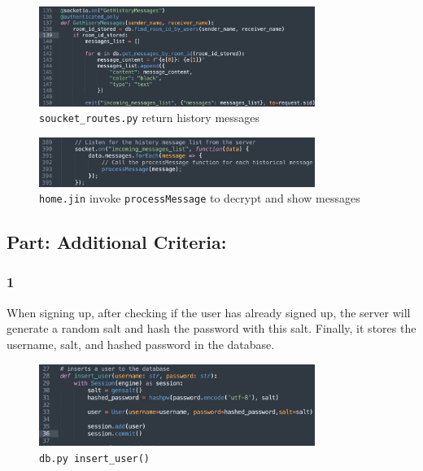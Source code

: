 \documentclass[12pt]{article}
\begin{document}
            \begin{figure}[H]
                \centering
                \includegraphics[width=0.8\textwidth]{graphs/return_history_message.jpg}
                \caption{\texttt{soucket\_routes.py} return history messages}
                \label{return history message}
            \end{figure}


            \begin{figure}[H]
                \centering
                \includegraphics[width=0.8\textwidth]{graphs/show_history_message.jpg}
                \caption{\texttt{home.jin} invoke \texttt{processMessage} to decrypt and show messages}
                \label{show history message}
            \end{figure}

    \subsection*{Part: Additional Criteria:}

        \subsubsection*{1} When signing up, after checking if the user has already signed up, the server will generate a random salt and hash the password with this salt. Finally, it stores the username, salt, and hashed password in the database.

        \begin{figure}[H]
            \centering
            \includegraphics[width=0.8\textwidth]{graphs/insert_user.jpg}
            \caption{\texttt{db.py insert\_user()}}
        \end{figure}
\end{document}
